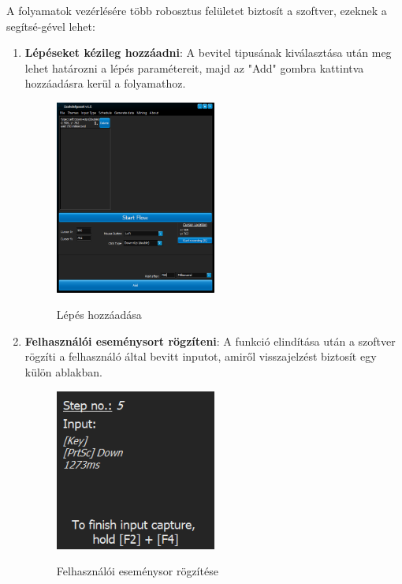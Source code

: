 
A folyamatok vezérlésére több robosztus felületet biztosít a szoftver, ezeknek a segítsé\hyp{}gével lehet:
\begin{enumerate}
	\item{
		\textbf{Lépéseket kézileg hozzáadni}: A bevitel tipusának kiválasztása után meg lehet határozni a lépés paramétereit, majd az "Add" gombra kattintva hozzáadásra kerül a folyamathoz.
		\begin{figure}[h!]
			\begin{center}
				\caption{Lépés hozzáadása}
				\includegraphics[width=0.5\textwidth, keepaspectratio=true]{images/img_flow_add}\\
				\label{fig:example}
			\end{center}
		\end{figure}
	}
	\item{
		\textbf{Felhasználói eseménysort rögzíteni}: A funkció elindítása után a szoftver rögzíti a felhasználó által bevitt inputot, amiről visszajelzést biztosít egy külön ablakban.
		\begin{figure}[h!]
			\begin{center}
				\caption{Felhasználói eseménysor rögzítése}
				\includegraphics[width=0.5\textwidth, keepaspectratio=true]{images/img_flow_capture}\\

\end{center}
\end{figure}}
\end{enumerate}
